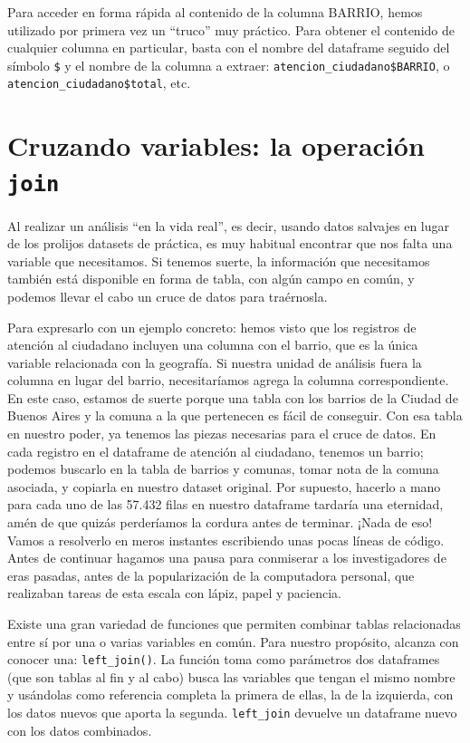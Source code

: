 \documentclass[spanish,]{book}
\begin{document}
Para acceder en forma rápida al contenido de la columna BARRIO, hemos utilizado por primera vez un ``truco'' muy práctico. Para obtener el contenido de cualquier columna en particular, basta con el nombre del dataframe seguido del símbolo \texttt{\$} y el nombre de la columna a extraer: \texttt{atencion\_ciudadano\$BARRIO}, o \texttt{atencion\_ciudadano\$total}, etc.

\hypertarget{cruzando-variables-la-operaciuxf3n-join}{%
\section{\texorpdfstring{Cruzando variables: la operación \texttt{join}}{Cruzando variables: la operación join}}\label{cruzando-variables-la-operaciuxf3n-join}}

Al realizar un análisis ``en la vida real'', es decir, usando datos salvajes en lugar de los prolijos datasets de práctica, es muy habitual encontrar que nos falta una variable que necesitamos. Si tenemos suerte, la información que necesitamos también está disponible en forma de tabla, con algún campo en común, y podemos llevar el cabo un cruce de datos para traérnosla.

Para expresarlo con un ejemplo concreto: hemos visto que los registros de atención al ciudadano incluyen una columna con el barrio, que es la única variable relacionada con la geografía. Si nuestra unidad de análisis fuera la columna en lugar del barrio, necesitaríamos agrega la columna correspondiente. En este caso, estamos de suerte porque una tabla con los barrios de la Ciudad de Buenos Aires y la comuna a la que pertenecen es fácil de conseguir. Con esa tabla en nuestro poder, ya tenemos las piezas necesarias para el cruce de datos. En cada registro en el dataframe de atención al ciudadano, tenemos un barrio; podemos buscarlo en la tabla de barrios y comunas, tomar nota de la comuna asociada, y copiarla en nuestro dataset original. Por supuesto, hacerlo a mano para cada uno de las 57.432 filas en nuestro dataframe tardaría una eternidad, amén de que quizás perderíamos la cordura antes de terminar. ¡Nada de eso! Vamos a resolverlo en meros instantes escribiendo unas pocas líneas de código. Antes de continuar hagamos una pausa para conmiserar a los investigadores de eras pasadas, antes de la popularización de la computadora personal, que realizaban tareas de esta escala con lápiz, papel y paciencia.

Existe una gran variedad de funciones que permiten combinar tablas relacionadas entre sí por una o varias variables en común. Para nuestro propósito, alcanza con conocer una: \texttt{left\_join()}. La función toma como parámetros dos dataframes (que son tablas al fin y al cabo) busca las variables que tengan el mismo nombre y usándolas como referencia completa la primera de ellas, la de la izquierda, con los datos nuevos que aporta la segunda. \texttt{left\_join} devuelve un dataframe nuevo con los datos combinados.
\end{document}
